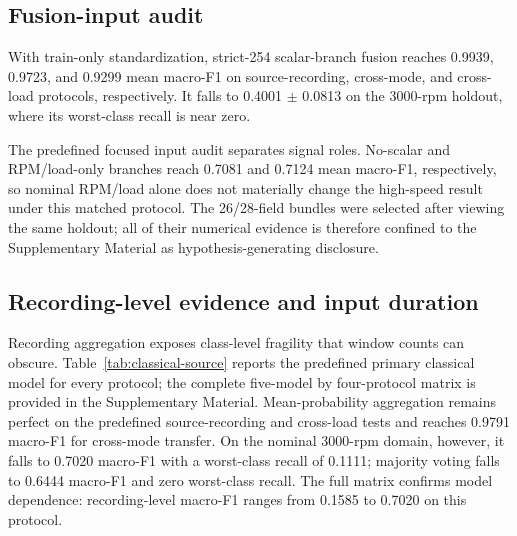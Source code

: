 \documentclass[machines,article,submit,oneauthor]{Definitions/mdpi}
\begin{document}
\subsection{Fusion-input audit}
With train-only standardization, strict-254 scalar-branch fusion reaches 0.9939, 0.9723, and 0.9299 mean macro-F1 on source-recording, cross-mode, and cross-load protocols, respectively. It falls to 0.4001 $\pm$ 0.0813 on the 3000-rpm holdout, where its worst-class recall is near zero.

The predefined focused input audit separates signal roles. No-scalar and RPM/load-only branches reach 0.7081 and 0.7124 mean macro-F1, respectively, so nominal RPM/load alone does not materially change the high-speed result under this matched protocol. The 26/28-field bundles were selected after viewing the same holdout; all of their numerical evidence is therefore confined to the Supplementary Material as hypothesis-generating disclosure.


\begin{table}[H]
\centering
\caption{Predefined input-definition audit for the 1000/2000-to-3000-rpm holdout. Values are means and standard deviations across five optimization seeds. Post-hoc 26/28-field configurations are excluded and reported only in the Supplementary Material.}
\label{tab:fusion}
\small
{}
\end{table}


\subsection{Recording-level evidence and input duration}
Recording aggregation exposes class-level fragility that window counts can obscure. Table~\ref{tab:classical-source} reports the predefined primary classical model for every protocol; the complete five-model by four-protocol matrix is provided in the Supplementary Material. Mean-probability aggregation remains perfect on the predefined source-recording and cross-load tests and reaches 0.9791 macro-F1 for cross-mode transfer. On the nominal 3000-rpm domain, however, it falls to 0.7020 macro-F1 with a worst-class recall of 0.1111; majority voting falls to 0.6444 macro-F1 and zero worst-class recall. The full matrix confirms model dependence: recording-level macro-F1 ranges from 0.1585 to 0.7020 on this protocol.
\end{document}
